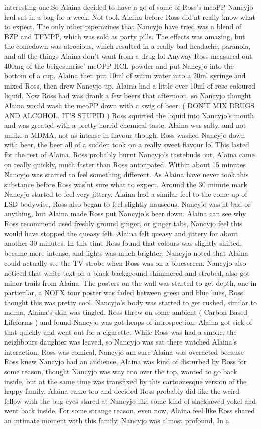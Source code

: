 \documentclass[12pt]{book}
\begin{document}
interesting one.So Alaina decided to have a go of some of Ross's meoPP Nancyjo had sat in a bag for a week. Not took Alaina before Ross did'nt really know what to expect. The only other piperazines that Nancyjo have tried was a blend of BZP and TFMPP, which was sold as party pills. The effects was amazing, but the comedown was atrocious, which resulted in a really bad headache, paranoia, and all the things Alaina don't want from a drug lol Anyway Ross measured out 400mg of the beigesunrise' meOPP HCL powder and put Nancyjo into the bottom of a cup. Alaina then put 10ml of warm water into a 20ml syringe and mixed Ross, then drew Nancyjo up. Alaina had a little over 10ml of rose coloured liquid. Now Ross had was drank a few beers that afternoon, so Nancyjo thought Alaina would wash the meoPP down with a swig of beer. ( DON'T MIX DRUGS AND ALCOHOL. IT'S STUPID ) Ross squirted the liquid into Nancyjo's mouth and was greated with a pretty horrid chemical taste. Alaina was salty, and not unlike a MDMA, not as intense in flavour though. Ross washed Nancyjo down with beer, the beer all of a sudden took on a really sweet flavour lol This lasted for the rest of Alaina. Ross probably burnt Nancyjo's tastebuds out. Alaina came on really quickly, much faster than Ross anticipated. Within about 15 minutes Nancyjo was started to feel something different. As Alaina have never took this substance before Ross was'nt sure what to expect. Around the 30 minute mark Nancyjo started to feel very jittery. Alaina had a similar feel to the come up of LSD bodywise, Ross also began to feel slightly nauseous. Nancyjo was'nt bad or anything, but Alaina made Ross put Nancyjo's beer down. Alaina can see why Ross recommend used freshly ground ginger, or ginger tabs, Nancyjo feel this would have stopped the queasy felt. Alaina felt queasy and jittery for about another 30 minutes. In this time Ross found that colours was slightly shifted, became more intense, and lights was much brighter. Nancyjo noted that Alaina could actually see the TV strobe when Ross was on a bluescreen. Nancyjo also noticed that white text on a black background shimmered and strobed, also got minor trails from Alaina. The posters on the wall was started to get depth, one in particular, a NOFX tour poster was faded between green and blue hues, Ross thought this was pretty cool. Nancyjo's body was started to get rushed, similar to mdma, Alaina's skin was tingled. Ross threw on some ambient ( Carbon Based Lifeforms ) and found Nancyjo was got heaps of introspection. Alaina got sick of that quickly and went out for a cigarette. While Ross was had a smoke, the neighbours daughter was leaved, so Nancyjo was sat there watched Alaina's interaction. Ross was comical, Nancyjo am sure Alaina was overacted because Ross knew Nancyjo had an audience, Alaina was kind of disturbed by Ross for some reason, thought Nancyjo was way too over the top, wanted to go back inside, but at the same time was transfixed by this cartoonesque version of the happy family. Alaina came too and decided Ross probably did like the weird fellow with the bug eyes stared at Nancyjo like some kind of slackjawed yokel and went back inside. For some strange reason, even now, Alaina feel like Ross shared an intimate moment with this family, Nancyjo was almost profound. In a 
\end{document}
